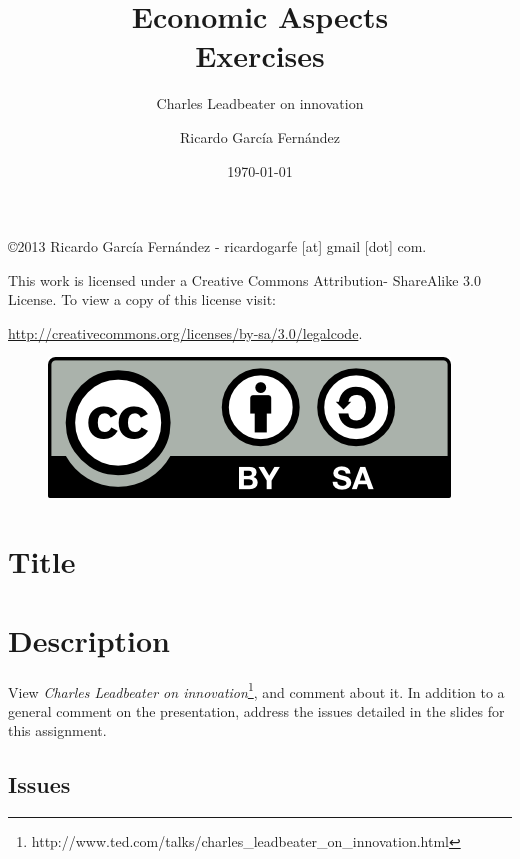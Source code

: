 \documentclass[11pt]{scrartcl}
\title{\textbf{Economic Aspects\\
                Exercises}}
\subtitle{Charles Leadbeater on innovation}
\author{Ricardo Garc\'ia Fern\'andez}
\date{\today}
\begin{document}
\maketitle

\vfill

\begin{flushright}
    \copyright  2013 Ricardo Garc\'ia Fern\'andez - ricardogarfe [at] gmail [dot] com.

    This work is licensed under a Creative Commons Attribution- ShareAlike 3.0 License.
    To view a copy of this license visit:
 
    \url{http://creativecommons.org/licenses/by-sa/3.0/legalcode}.
\end{flushright}

\begin{figure}[h]
    \begin{flushright}	
        \includegraphics{by-sa}
        \label{fig:by-sa}
    \end{flushright}
\end{figure}

\newpage

\section{Title}

\section{Description}

View \emph{Charles Leadbeater on innovation}\footnote{http://www.ted.com/talks/charles\_leadbeater\_on\_innovation.html}, and comment about it. In addition to a general comment on the presentation, address the issues detailed in the slides for this assignment.

\subsection{Issues}
\end{document}
